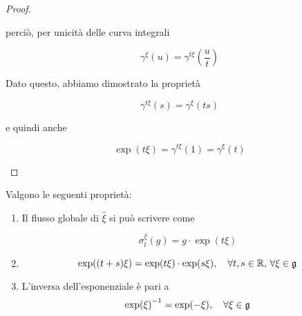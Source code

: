 \begin{proof}
\begin{enumerate}
		perciò, per unicità delle curva integrali
		
		\begin{equation}
			\gamma^{\xi}(u) = \gamma^{t \xi} \left( \dfrac{u}{t} \right)
		\end{equation}
	
		Dato questo, abbiamo dimostrato la proprietà
		
		\begin{equation}
			\gamma^{t \xi}(s) = \gamma^{\xi}(t s)
		\end{equation}
	
		e quindi anche
		
		\begin{equation}
			\exp(t \xi) = \gamma^{t \xi}(1) = \gamma^{\xi}(t)
		\end{equation}
	\end{enumerate}
\end{proof}

\begin{corollary}
	Valgono le seguenti proprietà:
	
	\begin{enumerate}
		\item Il flusso globale di $ \hat{\xi} $ si può scrivere come
		
		\begin{equation}
			\sigma_{t}^{\xi}(g) = g \cdot \exp(t \xi)
		\end{equation}
		
		\item %
		\begin{equation}
			\exp((t+s) \xi) = \exp(t \xi) \cdot \exp(s \xi) \qcomma \forall t,s \in \R, \, \forall \xi \in \g
		\end{equation}
		
		\item L'inversa dell'esponenziale è pari a
		\begin{equation}
			\exp(\xi)^{-1} = \exp(-\xi) \qcomma \forall \xi \in \g
		\end{equation}
	\end{enumerate}
\end{corollary}

